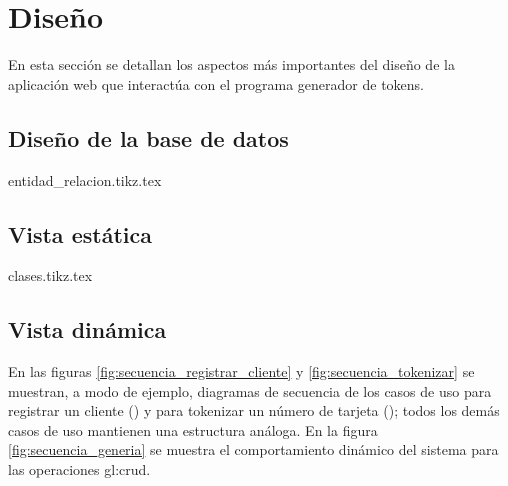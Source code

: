 %
%

\section{Diseño}

En esta sección se detallan los aspectos más importantes del diseño de la
aplicación web que interactúa con el programa generador de tokens.

\subsection{Diseño de la base de datos}

\begin{sidewaysfigure}
  \begin{center}
    {entidad_relacion.tikz.tex}
    \caption{Diagrama Entidad-Relación de la base de datos de la aplicación.}
    \label{fig:entidad_relacion}
  \end{center}
\end{sidewaysfigure}

\subsection{Vista estática}

\begin{sidewaysfigure}
  \begin{center}
    {clases.tikz.tex}
    \caption{Diagrama de clases de aplicación web.}
    \label{fig:clases_aplicacion_web}
  \end{center}
\end{sidewaysfigure}

\subsection{Vista dinámica}

En las figuras \ref{fig:secuencia_registrar_cliente} y
\ref{fig:secuencia_tokenizar} se muestran, a modo de ejemplo, diagramas de
secuencia de los casos de uso para registrar un cliente
() y para tokenizar un número de tarjeta
(); todos los demás casos de uso mantienen
una estructura análoga. En la figura \ref{fig:secuencia_generia} se muestra el
comportamiento dinámico del sistema para las operaciones \gls{gl:crud}.

